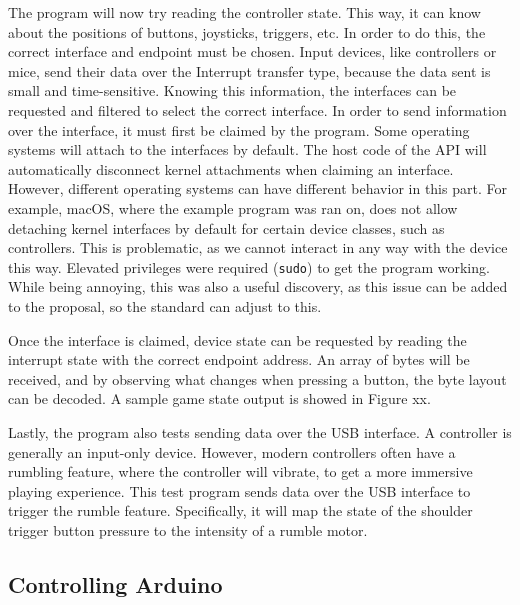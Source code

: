 The program will now try reading the controller state. This way, it can know about the positions of buttons, joysticks, triggers, etc. In order to do this, the correct interface and endpoint must be chosen. Input devices, like controllers or mice, send their data over the Interrupt transfer type, because the data sent is small and time-sensitive. Knowing this information, the interfaces can be requested and filtered to select the correct interface. In order to send information over the interface, it must first be claimed by the program. Some operating systems will attach to the interfaces by default. The host code of the API will automatically disconnect kernel attachments when claiming an interface. However, different operating systems can have different behavior in this part. For example, macOS, where the example program was ran on, does not allow detaching kernel interfaces by default for certain device classes, such as controllers. This is problematic, as we cannot interact in any way with the device this way. Elevated privileges were required (\texttt{sudo}) to get the program working. While being annoying, this was also a useful discovery, as this issue can be added to the proposal, so the standard can adjust to this.

Once the interface is claimed, device state can be requested by reading the interrupt state with the correct endpoint address. An array of bytes will be received, and by observing what changes when pressing a button, the byte layout can be decoded. A sample game state output is showed in Figure xx.

Lastly, the program also tests sending data over the USB interface. A controller is generally an input-only device. However, modern controllers often have a rumbling feature, where the controller will vibrate, to get a more immersive playing experience. This test program sends data over the USB interface to trigger the rumble feature. Specifically, it will map the state of the shoulder trigger button pressure to the intensity of a rumble motor.

\subsection{Controlling Arduino}
